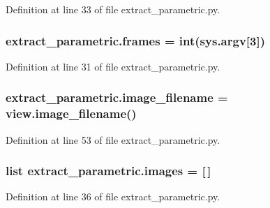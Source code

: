 Definition at line 33 of file extract\+\_\+parametric.\+py.

\subsubsection[{\texorpdfstring{frames}{frames}}]{\setlength{\rightskip}{0pt plus 5cm}extract\+\_\+parametric.\+frames = int(sys.\+argv\mbox{[}3\mbox{]})}\hypertarget{namespaceextract__parametric_ab661bcbac8504f589b9ee4d6ee638a6d}{}\label{namespaceextract__parametric_ab661bcbac8504f589b9ee4d6ee638a6d}


Definition at line 31 of file extract\+\_\+parametric.\+py.

\subsubsection[{\texorpdfstring{image\+\_\+filename}{image_filename}}]{\setlength{\rightskip}{0pt plus 5cm}extract\+\_\+parametric.\+image\+\_\+filename = view.\+image\+\_\+filename()}\hypertarget{namespaceextract__parametric_ab9475a5f123365a5a868b9481e87d163}{}\label{namespaceextract__parametric_ab9475a5f123365a5a868b9481e87d163}


Definition at line 53 of file extract\+\_\+parametric.\+py.

\subsubsection[{\texorpdfstring{images}{images}}]{\setlength{\rightskip}{0pt plus 5cm}list extract\+\_\+parametric.\+images = \mbox{[}$\,$\mbox{]}}\hypertarget{namespaceextract__parametric_a04c0fe150206be8c6736ad9452783f23}{}\label{namespaceextract__parametric_a04c0fe150206be8c6736ad9452783f23}


Definition at line 36 of file extract\+\_\+parametric.\+py.

